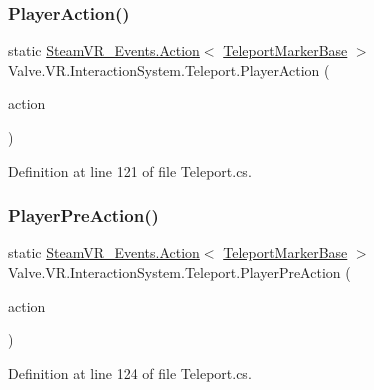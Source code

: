 \subsubsection{\texorpdfstring{PlayerAction()}{PlayerAction()}}
{\footnotesize\ttfamily static \mbox{\hyperlink{class_valve_1_1_v_r_1_1_steam_v_r___events_1_1_action}{Steam\+V\+R\+\_\+\+Events.\+Action}}$<$ \mbox{\hyperlink{class_valve_1_1_v_r_1_1_interaction_system_1_1_teleport_marker_base}{Teleport\+Marker\+Base}} $>$ Valve.\+V\+R.\+Interaction\+System.\+Teleport.\+Player\+Action (\begin{DoxyParamCaption}\item[{Unity\+Action$<$ \mbox{\hyperlink{class_valve_1_1_v_r_1_1_interaction_system_1_1_teleport_marker_base}{Teleport\+Marker\+Base}} $>$}]{action }\end{DoxyParamCaption})\hspace{0.3cm}{\ttfamily [static]}}



Definition at line 121 of file Teleport.\+cs.

\mbox{\label{class_valve_1_1_v_r_1_1_interaction_system_1_1_teleport_add8684ac5cd745c1ffdad09778d4b85b}} 
\subsubsection{\texorpdfstring{PlayerPreAction()}{PlayerPreAction()}}
{\footnotesize\ttfamily static \mbox{\hyperlink{class_valve_1_1_v_r_1_1_steam_v_r___events_1_1_action}{Steam\+V\+R\+\_\+\+Events.\+Action}}$<$ \mbox{\hyperlink{class_valve_1_1_v_r_1_1_interaction_system_1_1_teleport_marker_base}{Teleport\+Marker\+Base}} $>$ Valve.\+V\+R.\+Interaction\+System.\+Teleport.\+Player\+Pre\+Action (\begin{DoxyParamCaption}\item[{Unity\+Action$<$ \mbox{\hyperlink{class_valve_1_1_v_r_1_1_interaction_system_1_1_teleport_marker_base}{Teleport\+Marker\+Base}} $>$}]{action }\end{DoxyParamCaption})\hspace{0.3cm}{\ttfamily [static]}}



Definition at line 124 of file Teleport.\+cs.

